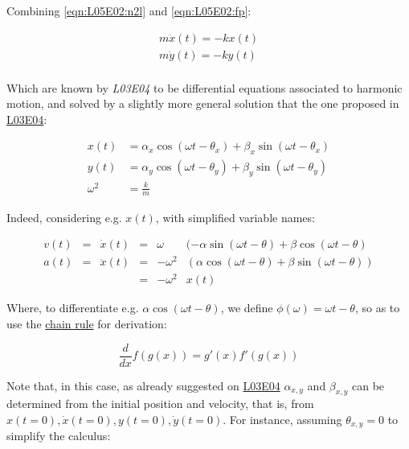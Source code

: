 \documentclass[solutions.tex]{subfiles}
\begin{document}
Combining \eqref{eqn:L05E02:n2l} and \eqref{eqn:L05E02:fp}:

\begin{equation}
	\label{eqn:L05E02:ediff}
	\begin{aligned}
		m\ddot{x}(t) = -kx(t) \\
		m\ddot{y}(t) = -ky(t) \\
	\end{aligned}
\end{equation}

Which are known by \textit{L03E04} to be differential equations
associated to harmonic motion, and solved by a slightly more general
solution that the one proposed in
\href{https://tales.mbivert.com/on-the-harmonic-oscillator/}{L03E04}:

\begin{equation}
	\label{eqn:L05E02:sols}
	\begin{aligned}
		x(t) &= \alpha_x\cos(\omega t-\theta_x)+\beta_x\sin(\omega t-\theta_x) \\
		y(t) &= \alpha_y\cos(\omega t-\theta_y)+\beta_y\sin(\omega t-\theta_y) \\
		\omega^2 &= \frac{k}{m}
	\end{aligned}
\end{equation}

Indeed, considering e.g. $x(t)$, with simplified variable names:

\begin{equation}
	\begin{aligned}
		v(t) &=& \dot{x}(t) &=& \omega&(-\alpha\sin(\omega t-\theta)+\beta\cos(\omega t-\theta) \\
		a(t) &=& \ddot{x}(t) &=& -\omega^2&(\alpha\cos(\omega t-\theta)+\beta\sin(\omega t-\theta)) \\
		~ &~& ~ &=& -\omega^2&x(t)
	\end{aligned}
\end{equation}

Where, to differentiate e.g. $\alpha\cos(\omega t - \theta)$, we define
$\phi(\omega) = \omega t - \theta$, so as to use the
\href{https://en.wikipedia.org/wiki/Chain\_rule}{chain rule}
for derivation:

\begin{equation}
	\frac{d}{dx}f(g(x)) = g'(x)f'(g(x))
\end{equation}

Note that, in this case, as already suggested on
\href{https://tales.mbivert.com/on-the-harmonic-oscillator/}{L03E04}
$\alpha_{x,y}$ and $\beta_{x,y}$ can be
determined from the initial position and velocity, that is, from
$x(t=0), \dot{x}(t=0), y(t=0), \dot{y}(t=0)$. For instance,
assuming $\theta_{x,y}=0$ to simplify the calculus:
\end{document}
